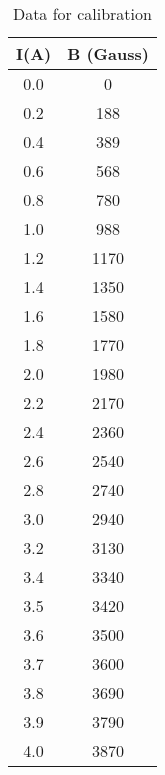 \begin{table}[H]
    \centering
    \begin{tabular}{|c|c|}
    \hline
     I(A)& B (Gauss) \\ \hline
     0.0 &    0 \\
     0.2 &  188 \\
     0.4 &  389 \\
     0.6 &  568 \\
     0.8 &  780 \\
     1.0 &  988 \\
     1.2 & 1170 \\
     1.4 & 1350 \\
     1.6 & 1580 \\
     1.8 & 1770 \\
     2.0 & 1980 \\
     2.2 & 2170 \\
     2.4 & 2360 \\
     2.6 & 2540 \\
     2.8 & 2740 \\
     3.0 & 2940 \\
     3.2 & 3130 \\
     3.4 & 3340 \\
     3.5 & 3420 \\
     3.6 & 3500 \\
     3.7 & 3600 \\
     3.8 & 3690 \\
     3.9 & 3790 \\
     4.0 & 3870 \\
    \hline
    \end{tabular}
    \caption{Data for calibration}
    \label{tab:1}
\end{table}